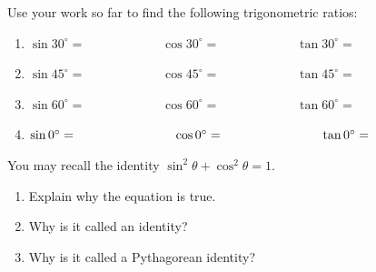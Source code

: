 \begin{prob}
Use your work so far to find the following trigonometric ratios:
\begin{enumerate}
\item $\sin 30^\circ = \hspace{1in} \cos30^\circ = \hspace{1in} \tan30^\circ =$
\item $\sin 45^\circ = \hspace{1in} \cos45^\circ = \hspace{1in} \tan45^\circ =$
\item $\sin 60^\circ = \hspace{1in} \cos60^\circ = \hspace{1in} \tan60^\circ =$
\item $\sin 0^\circ = \hspace{1.08in} \cos0^\circ = \hspace{1.08in} \tan0^\circ =$
\end{enumerate}
\end{prob}

\begin{prob}
You may recall the identity $\sin^2\theta+\cos^2\theta=1$.  
\begin{enumerate}
\item Explain why the equation is true.  
\item Why is it called an identity? 
\item Why is it called a Pythagorean identity?  
\end{enumerate}
\end{prob}

